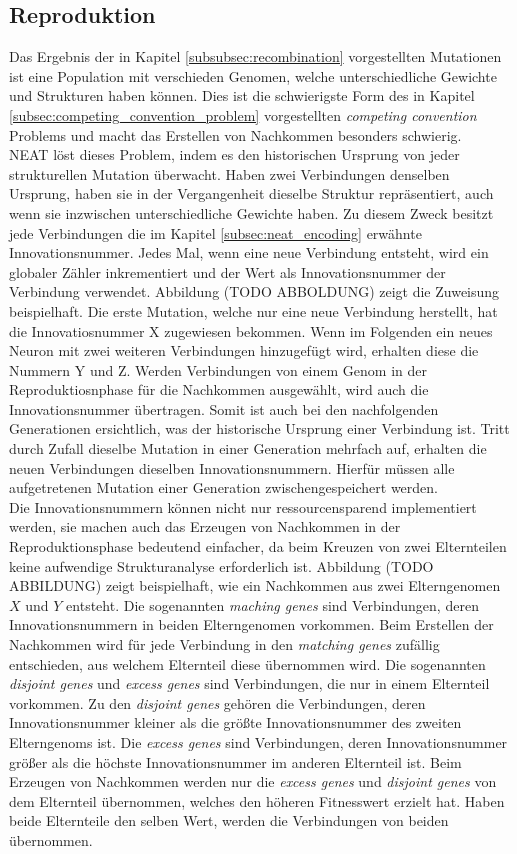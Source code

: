 \subsection{Reproduktion}
\label{subsec:neat_reproduction}
Das Ergebnis der in Kapitel \ref{subsubsec:recombination} vorgestellten Mutationen ist eine Population mit verschieden Genomen, welche unterschiedliche Gewichte und Strukturen haben können. Dies ist die schwierigste Form des in Kapitel \ref{subsec:competing_convention_problem} vorgestellten \emph{competing convention} Problems und macht das Erstellen von Nachkommen besonders schwierig.\\
\ac{NEAT} löst dieses Problem, indem es den historischen Ursprung von jeder strukturellen Mutation überwacht. Haben zwei Verbindungen denselben Ursprung, haben sie in der Vergangenheit dieselbe Struktur repräsentiert, auch wenn sie inzwischen unterschiedliche Gewichte haben. Zu diesem Zweck besitzt jede Verbindungen die im Kapitel \ref{subsec:neat_encoding} erwähnte Innovationsnummer. Jedes Mal, wenn eine neue Verbindung entsteht, wird ein globaler Zähler inkrementiert und der Wert als Innovationsnummer der Verbindung verwendet. Abbildung (TODO ABBOLDUNG) zeigt die Zuweisung beispielhaft. Die erste Mutation, welche nur eine neue Verbindung herstellt, hat die Innovatiosnummer X zugewiesen bekommen. Wenn im Folgenden ein neues Neuron mit zwei weiteren Verbindungen hinzugefügt wird, erhalten diese die Nummern Y und Z. Werden Verbindungen von einem Genom in der Reproduktiosnphase für die Nachkommen ausgewählt, wird auch die Innovationsnummer übertragen. Somit ist auch bei den nachfolgenden Generationen ersichtlich, was der historische Ursprung einer Verbindung ist. Tritt durch Zufall dieselbe Mutation in einer Generation mehrfach auf, erhalten die neuen Verbindungen dieselben Innovationsnummern. Hierfür müssen alle aufgetretenen Mutation einer Generation zwischengespeichert werden. \\
Die Innovationsnummern können nicht nur ressourcensparend implementiert werden, sie machen auch das Erzeugen von Nachkommen in der Reproduktionsphase bedeutend einfacher, da beim Kreuzen von zwei Elternteilen keine aufwendige Strukturanalyse erforderlich ist. Abbildung (TODO ABBILDUNG) zeigt beispielhaft, wie ein Nachkommen aus zwei Elterngenomen $X$ und $Y$ entsteht. Die sogenannten \emph{maching genes} sind Verbindungen, deren Innovationsnummern in beiden Elterngenomen vorkommen. Beim Erstellen der Nachkommen wird für jede Verbindung in den \emph{matching genes} zufällig entschieden, aus welchem Elternteil diese übernommen wird. Die sogenannten \emph{disjoint genes} und \emph{excess genes} sind Verbindungen, die nur in einem Elternteil vorkommen. Zu den \emph{disjoint genes} gehören die Verbindungen, deren Innovationsnummer kleiner als die größte Innovationsnummer des zweiten Elterngenoms ist. Die \emph{excess genes} sind Verbindungen, deren Innovationsnummer größer als die höchste Innovationsnummer im anderen Elternteil ist. Beim Erzeugen von Nachkommen werden nur die \emph{excess genes} und \emph{disjoint genes} von dem Elternteil übernommen, welches den höheren Fitnesswert erzielt hat. Haben beide Elternteile den selben Wert, werden die Verbindungen von beiden übernommen.

